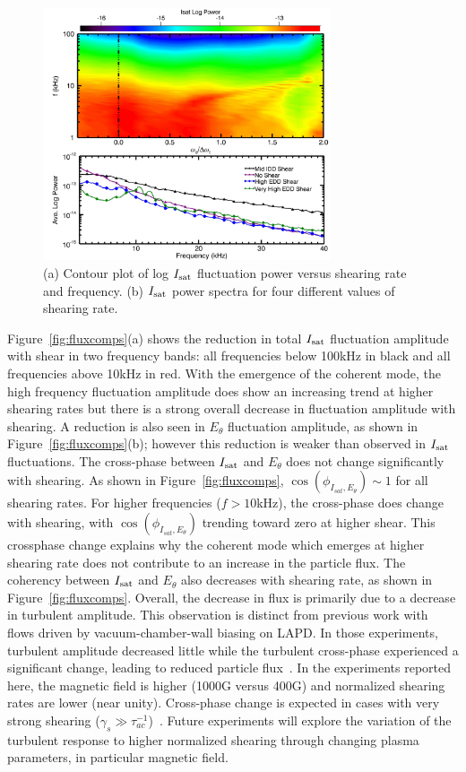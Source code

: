 \documentclass[aps,prl,amsmath,amssymb,preprint,superscriptaddress]{revtex4}
\begin{document}
\begin{figure}[!htbp]
\centerline{
\includegraphics[width=8.5cm]{powercontour}}
\caption{\label{fig:powercontour} (a) Contour plot of log $I_{\rm sat}$ fluctuation power versus shearing rate and frequency. (b) $I_{\rm sat}$ power spectra for four different values of shearing rate.}
\end{figure}

Figure~\ref{fig:fluxcomps}(a) shows the reduction in total $I_{\rm sat}$ fluctuation amplitude with shear in two frequency bands: all frequencies below 100kHz in black and all frequencies above 10kHz in red. With the emergence of the coherent mode, the
high frequency fluctuation amplitude does show an increasing trend at higher shearing
rates but there is a strong overall decrease in fluctuation amplitude with shearing.
A reduction is also seen in $E_\theta$ fluctuation amplitude, as shown in
Figure~\ref{fig:fluxcomps}(b); however this reduction is weaker than
observed in $I_{\rm sat}$ fluctuations.  The cross-phase between
$I_{\rm sat}$ and $E_\theta$ does not change significantly with
shearing. As shown in Figure~\ref{fig:fluxcomps},
$\cos(\phi_{I_{sat},E_\theta}) \sim 1$ for all shearing rates.  For
higher frequencies ($f > 10$kHz), the cross-phase does change with
shearing, with $\cos(\phi_{I_{sat},E_\theta})$ trending toward zero at
higher shear.  This crossphase change explains why the coherent mode
which emerges at higher shearing rate does not contribute to an
increase in the particle flux.  The coherency between $I_{\rm sat}$ and
$E_\theta$ also decreases with shearing rate, as shown in 
Figure~\ref{fig:fluxcomps}.  Overall, the decrease in flux is primarily
due to a decrease in turbulent amplitude.  This observation is distinct from previous work with flows driven by vacuum-chamber-wall
biasing on LAPD. In those experiments, turbulent amplitude decreased little while the
turbulent cross-phase experienced a significant change, leading to
reduced particle flux~\cite{carter09}.  In the experiments reported
here, the magnetic field is higher (1000G versus 400G) and normalized
shearing rates are lower (near unity).  Cross-phase change is expected
in cases with very strong shearing ($\gamma_{s} \gg \tau_{ac}^{-1}$)~\cite{terry01}.  Future experiments will explore the
variation of the turbulent response to higher normalized shearing
through changing plasma parameters, in particular magnetic field.  
\end{document}
